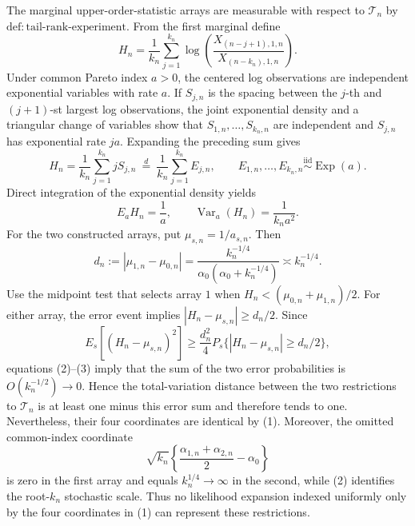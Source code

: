 The marginal upper-order-statistic arrays are measurable with respect to \(\mathcal T_n\) by \(\mathrm{def{:}tail\text{-}rank\text{-}experiment}\).  From the first marginal define
\[
 H_n=\frac1{k_n}\sum_{j=1}^{k_n}
 \log\!\left(\frac{X_{(n-j+1),1,n}}{X_{(n-k_n),1,n}}\right).
\]
Under common Pareto index \(a>0\), the centered log observations are independent exponential variables with rate \(a\).  If \(S_{j,n}\) is the spacing between the \(j\)-th and \((j+1)\)-st largest log observations, the joint exponential density and a triangular change of variables show that \(S_{1,n},\ldots,S_{k_n,n}\) are independent and \(S_{j,n}\) has exponential rate \(ja\).  Expanding the preceding sum gives
\[
 H_n=\frac1{k_n}\sum_{j=1}^{k_n}jS_{j,n}
 \ \stackrel{d}{=}\ \frac1{k_n}\sum_{j=1}^{k_n}E_{j,n},
 \qquad E_{1,n},\ldots,E_{k_n,n}\overset{\mathrm{iid}}{\sim}\operatorname{Exp}(a).
\]
Direct integration of the exponential density yields
\[
 E_aH_n=\frac1a,
 \qquad
 \operatorname{Var}_a(H_n)=\frac1{k_na^2}. \tag{2}
\]
For the two constructed arrays, put \(\mu_{s,n}=1/a_{s,n}\).  Then
\[
 d_n:=|\mu_{1,n}-\mu_{0,n}|
 =\frac{k_n^{-1/4}}{\alpha_0(\alpha_0+k_n^{-1/4})}
 \asymp k_n^{-1/4}. \tag{3}
\]
Use the midpoint test that selects array \(1\) when \(H_n<(\mu_{0,n}+\mu_{1,n})/2\).  For either array, the error event implies \(|H_n-\mu_{s,n}|\geq d_n/2\).  Since
\[
 E_s[(H_n-\mu_{s,n})^2]
 \geq \frac{d_n^2}{4}
 P_s\{|H_n-\mu_{s,n}|\geq d_n/2\},
\]
equations (2)--(3) imply that the sum of the two error probabilities is \(O(k_n^{-1/2})\to0\).  Hence the total-variation distance between the two restrictions to \(\mathcal T_n\) is at least one minus this error sum and therefore tends to one.  Nevertheless, their four coordinates are identical by (1).  Moreover, the omitted common-index coordinate
\[
 \sqrt{k_n}\left\{\frac{\alpha_{1,n}+\alpha_{2,n}}2-\alpha_0\right\}
\]
is zero in the first array and equals \(k_n^{1/4}\to\infty\) in the second, while (2) identifies the root-\(k_n\) stochastic scale.  Thus no likelihood expansion indexed uniformly only by the four coordinates in (1) can represent these restrictions.

